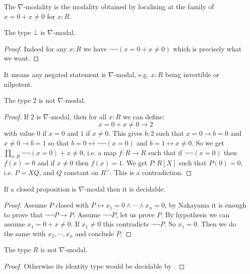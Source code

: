 \begin{definition}
The $\nabla$-modality is the modality obtained by localising at the family of $x=0+x\not=0$ for $x:R$.
\end{definition}

\begin{lemma}
The type $\bot$ is $\nabla$-modal.
\end{lemma}

\begin{proof}
Indeed for any $x:R$ we have $\neg\neg(x=0 + x\not=0)$ which is precisely what we want.
\end{proof}

\begin{remark}
It means any negated statement is $\nabla$-modal, e.g. $x:R$ being invertible or nilpotent.
\end{remark}

\begin{lemma}
The type $2$ is not $\nabla$-modal.
\end{lemma}

\begin{proof}
If $2$ is $\nabla$-modal, then for all $x:R$ we can define:
\[x=0+x\not=0\to 2\]
with value $0$ if $x=0$ and $1$ if $x\not=0$. This gives $b:2$ such that $x=0 \to b=0$ and $x\not=0\to b=1$ so that $b=0 \leftrightarrow \neg\neg(x=0)$ and $b=1\leftrightarrow x\not=0$. So we get $\prod_{x:R} \neg\neg(x=0)+x\not=0$, i.e. a map $f:R\to R$ such that if $\neg\neg(x=0)$ then $f(x)=0$ and if $x\not=0$ then $f(x)=1$. We get $P:R[X]$ such that $P(0)=0$, i.e. $P = XQ$, and $Q$ constant on $R^\times$. This is a contradiction.
\end{proof}

\begin{lemma}\label{closed-not-nabla}
If a closed proposition is $\nabla$-modal then it is decidable.
\end{lemma}

\begin{proof}
Assume $P$ closed with $P \leftrightarrow x_1=0\land\cdots\land x_n=0$, by Nakayama it is enough to prove that $\neg\neg P\to P$. Assume $\neg\neg P$, let us prove $P$. By hypothesis we can assume $x_1=0+x\not=0$. If $x_1\not=0$ this contradicts $\neg\neg P$. So $x_1=0$. Then we do the same with $x_2,\cdots,x_n$ and conclude $P$.
\end{proof}

\begin{corollary}
The type $R$ is not $\nabla$-modal.
\end{corollary}

\begin{proof}
Otherwise its identity type would be decidable by .
\end{proof}